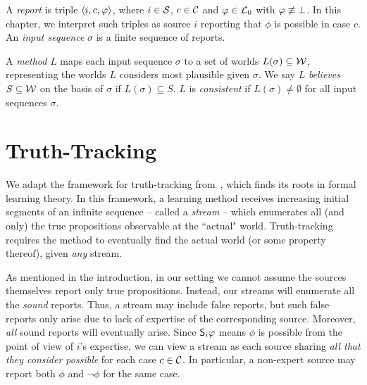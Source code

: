 A \emph{report} is triple $\tuple{i, c, \phi}$, where $i \in \srcs$, $c \in
\css$ and $\phi \in \Lprop$ with $\phi \not\equiv \falsum$. In this chapter, we
interpret such triples as source $i$ reporting that $\phi$ is possible in case
$c$. An \emph{input sequence} $\sigma$ is a finite sequence of reports.

A \emph{method} $L$ maps each input sequence $\sigma$ to a set of worlds
$L(\sigma) \subseteq \worlds$, representing the worlds $L$ considers most
plausible given $\sigma$.\footnotemark{} We say $L$ \emph{believes} $S
\subseteq \worlds$ on the basis of $\sigma$ if $L(\sigma) \subseteq S$. $L$ is
\emph{consistent} if $L(\sigma) \ne \emptyset$ for all input sequences
$\sigma$.


\section{Truth-Tracking}
\label{sec_truthtracking}

We adapt the framework for truth-tracking
from~\cite{Baltag_2016,baltag_tt_2019}, which finds its roots in
formal learning theory. In this framework, a learning method receives
increasing initial segments of an infinite sequence -- called a \emph{stream}
-- which enumerates all (and only) the true propositions observable at the
``actual" world. Truth-tracking requires the method to eventually find
the actual world (or some property thereof), given \emph{any} stream.

As mentioned in the introduction, in our setting we cannot assume the sources
themselves report only true propositions. Instead, our streams will enumerate
all the \emph{sound} reports. Thus, a stream may include false reports, but
such false reports only arise due to lack of expertise of the corresponding
source.\footnotemark{} Moreover, \emph{all} sound reports will eventually
arise. Since $\S_i\phi$ means $\phi$ is possible from the point of view of
$i$'s expertise, we can view a stream as each source sharing \emph{all that
they consider possible} for each case $c \in \css$. In particular, a non-expert
source may report both $\phi$ and $\neg\phi$ for the same case.


